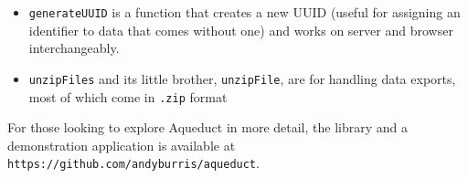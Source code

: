 \documentclass[manuscript,review,anonymous]{acmart}
\begin{document}
\begin{itemize}
\tightlist
\item
  \texttt{generateUUID} is a function that creates a new UUID (useful
  for assigning an identifier to data that comes without one) and works
  on server and browser interchangeably.
\item
  \texttt{unzipFiles} and its little brother, \texttt{unzipFile}, are
  for handling data exports, most of which come in \texttt{.zip} format
\end{itemize}

For those looking to explore Aqueduct in more detail, the library and a
demonstration application is available at
\texttt{https://github.com/andyburris/aqueduct}.
\end{document}
